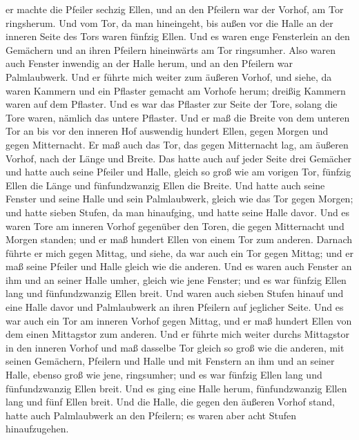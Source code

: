 er machte die Pfeiler sechzig Ellen, und an den Pfeilern war der Vorhof,
am Tor ringsherum.  Und vom Tor, da man hineingeht, bis
außen vor die Halle an der inneren Seite des Tors waren fünfzig Ellen.
 Und es waren enge Fensterlein an den Gemächern und an
ihren Pfeilern hineinwärts am Tor ringsumher. Also waren auch Fenster
inwendig an der Halle herum, und an den Pfeilern war Palmlaubwerk.
 Und er führte mich weiter zum äußeren Vorhof, und siehe,
da waren Kammern und ein Pflaster gemacht am Vorhofe herum; dreißig
Kammern waren auf dem Pflaster.  Und es war das Pflaster
zur Seite der Tore, solang die Tore waren, nämlich das untere Pflaster.
 Und er maß die Breite von dem unteren Tor an bis vor den
inneren Hof auswendig hundert Ellen, gegen Morgen und gegen Mitternacht.
 Er maß auch das Tor, das gegen Mitternacht lag, am äußeren
Vorhof, nach der Länge und Breite.  Das hatte auch auf
jeder Seite drei Gemächer und hatte auch seine Pfeiler und Halle, gleich
so groß wie am vorigen Tor, fünfzig Ellen die Länge und fünfundzwanzig
Ellen die Breite.  Und hatte auch seine Fenster und seine
Halle und sein Palmlaubwerk, gleich wie das Tor gegen Morgen; und hatte
sieben Stufen, da man hinaufging, und hatte seine Halle davor.
 Und es waren Tore am inneren Vorhof gegenüber den Toren,
die gegen Mitternacht und Morgen standen; und er maß hundert Ellen von
einem Tor zum anderen.  Darnach führte er mich gegen
Mittag, und siehe, da war auch ein Tor gegen Mittag; und er maß seine
Pfeiler und Halle gleich wie die anderen.  Und es waren
auch Fenster an ihm und an seiner Halle umher, gleich wie jene Fenster;
und es war fünfzig Ellen lang und fünfundzwanzig Ellen breit.
 Und waren auch sieben Stufen hinauf und eine Halle davor
und Palmlaubwerk an ihren Pfeilern auf jeglicher Seite. 
Und es war auch ein Tor am inneren Vorhof gegen Mittag, und er maß
hundert Ellen von dem einen Mittagstor zum anderen.  Und er
führte mich weiter durchs Mittagstor in den inneren Vorhof und maß
dasselbe Tor gleich so groß wie die anderen,  mit seinen
Gemächern, Pfeilern und Halle und mit Fenstern an ihm und an seiner
Halle, ebenso groß wie jene, ringsumher; und es war fünfzig Ellen lang
und fünfundzwanzig Ellen breit.  Und es ging eine Halle
herum, fünfundzwanzig Ellen lang und fünf Ellen breit.  Und
die Halle, die gegen den äußeren Vorhof stand, hatte auch Palmlaubwerk
an den Pfeilern; es waren aber acht Stufen hinaufzugehen. 
